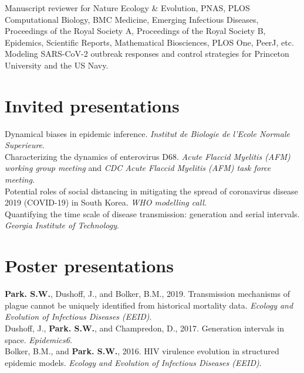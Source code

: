 \documentclass[11pt]{article} %
\begin{document}
Manuscript reviewer for Nature Ecology \& Evolution, PNAS, PLOS Computational Biology, BMC Medicine, Emerging Infectious Diseases, Proceedings of the Royal Society A, Proceedings of the Royal Society B, Epidemics, Scientific Reports, Mathematical Biosciences, PLOS One, PeerJ, etc.\\

Modeling SARS-CoV-2 outbreak responses and control strategies for Princeton University and the US Navy. 

\section*{Invited presentations}

 Dynamical biases in epidemic inference. \textit{Institut de Biologie de l'Ecole Normale Superieure}.\\

 Characterizing the dynamics of enterovirus D68. \textit{Acute Flaccid Myelitis (AFM) working group meeting} and \textit{CDC Acute Flaccid Myelitis (AFM) task force meeting}.\\

 Potential roles of social distancing in mitigating the spread of coronavirus disease 2019 (COVID-19) in South Korea. \textit{WHO modelling call}.\\

 Quantifying the time scale of disease transmission: generation and serial intervals. \textit{Georgia Institute of Technology}.\\

\section*{Poster presentations}

 \textbf{Park. S.W.}, Dushoff, J., and Bolker, B.M., 2019. Transmission mechanisms of plague cannot be uniquely identified from historical mortality data. \textit{Ecology and Evolution of Infectious Diseases (EEID)}.\\

 Dushoff, J., \textbf{Park. S.W.}, and Champredon, D., 2017. Generation intervals in space. \textit{Epidemics6}.\\

 Bolker, B.M., and \textbf{Park. S.W.}, 2016. HIV virulence evolution in structured epidemic models. \textit{Ecology and Evolution of Infectious Diseases (EEID)}.\\
\end{document}
